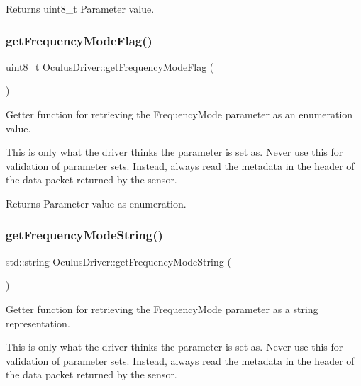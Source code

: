 \begin{DoxyReturn}{Returns}
uint8\+\_\+t Parameter value. 
\end{DoxyReturn}
\mbox{\label{classOculusDriver_a0aaac35eab767a90be0b1d789d2a00b4}} 
\subsubsection{\texorpdfstring{get\+Frequency\+Mode\+Flag()}{getFrequencyModeFlag()}}
{\footnotesize\ttfamily uint8\+\_\+t Oculus\+Driver\+::get\+Frequency\+Mode\+Flag (\begin{DoxyParamCaption}{ }\end{DoxyParamCaption})}

Getter function for retrieving the Frequency\+Mode parameter as an enumeration value.

This is only what the driver thinks the parameter is set as. Never use this for validation of parameter sets. Instead, always read the metadata in the header of the data packet returned by the sensor.

\begin{DoxyReturn}{Returns}
Parameter value as enumeration. 
\end{DoxyReturn}
\mbox{\label{classOculusDriver_aae6f2baf59064b855bebbd4bcd8ea169}} 
\subsubsection{\texorpdfstring{get\+Frequency\+Mode\+String()}{getFrequencyModeString()}}
{\footnotesize\ttfamily std\+::string Oculus\+Driver\+::get\+Frequency\+Mode\+String (\begin{DoxyParamCaption}{ }\end{DoxyParamCaption})}

Getter function for retrieving the Frequency\+Mode parameter as a string representation.

This is only what the driver thinks the parameter is set as. Never use this for validation of parameter sets. Instead, always read the metadata in the header of the data packet returned by the sensor.

